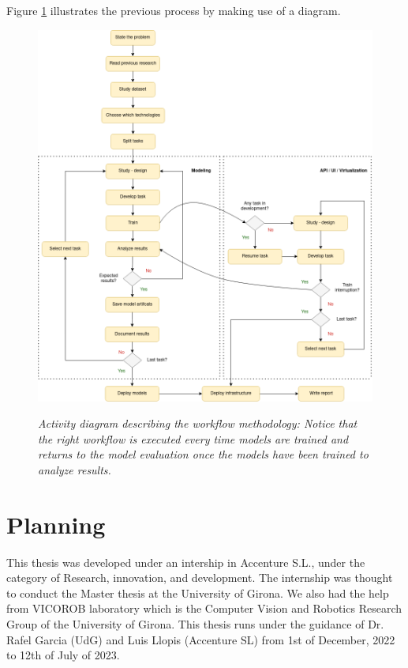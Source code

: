 Figure \ref{fig:flux_development} illustrates the previous process by making use of a diagram.

\newpage


\begin{figure}[H]
  \centering
  \includegraphics[width=\textwidth]{imatges/planing_and_methodology/EmplyedMethodology.png}
  \caption[Activity diagram describing the methodology]{\textit{Activity
  diagram describing the workflow methodology: Notice that the right workflow
  is executed every time models are trained and returns to the model evaluation
  once the models have been trained to analyze results.}}
  {\label{fig:flux_development}}
\end{figure}


\newpage


\section{Planning}

This thesis was developed under an intership in Accenture S.L.,
under the category of Research, innovation, and development. The internship
was thought to conduct the Master thesis at the University of Girona. We also
had the help from VICOROB laboratory which is the Computer Vision and Robotics
Research Group of the University of Girona. This thesis runs under the guidance
of Dr. Rafel Garcia (UdG) and Luis Llopis (Accenture SL) from 1st of December,
2022 to 12th of July of 2023. \\

